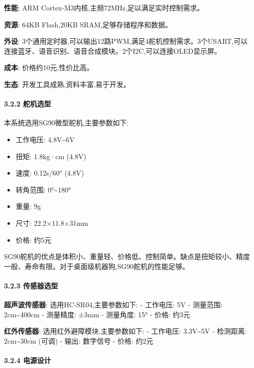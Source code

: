\documentclass[
]{article}
\providecommand{\tightlist}{%
  \setlength{\itemsep}{0pt}\setlength{\parskip}{0pt}}
\begin{document}
\textbf{性能}: ARM Cortex-M3内核,主频72MHz,足以满足实时控制需求。

\textbf{资源}: 64KB Flash,20KB SRAM,足够存储程序和数据。

\textbf{外设}:
3个通用定时器,可以输出12路PWM,满足4舵机控制需求。3个USART,可以连接蓝牙、语音识别、语音合成模块。2个I2C,可以连接OLED显示屏。

\textbf{成本}: 价格约10元,性价比高。

\textbf{生态}: 开发工具成熟,资料丰富,易于开发。

\hypertarget{ux8235ux673aux9009ux578b}{%
\paragraph{3.2.2 舵机选型}\label{ux8235ux673aux9009ux578b}}

本系统选用SG90微型舵机,主要参数如下:

\begin{itemize}
\tightlist
\item
  工作电压: 4.8V\textasciitilde6V
\item
  扭矩: 1.8kg·cm (4.8V)
\item
  速度: 0.12s/60° (4.8V)
\item
  转角范围: 0°\textasciitilde180°
\item
  重量: 9g
\item
  尺寸: 22.2×11.8×31mm
\item
  价格: 约5元
\end{itemize}

SG90舵机的优点是体积小、重量轻、价格低、控制简单。缺点是扭矩较小、精度一般、寿命有限。对于桌面级机器狗,SG90舵机的性能足够。

\hypertarget{ux4f20ux611fux5668ux9009ux578b}{%
\paragraph{3.2.3 传感器选型}\label{ux4f20ux611fux5668ux9009ux578b}}

\textbf{超声波传感器}: 选用HC-SR04,主要参数如下: - 工作电压: 5V -
测量范围: 2cm\textasciitilde400cm - 测量精度: ±3mm - 测量角度: 15° -
价格: 约3元

\textbf{红外传感器}: 选用红外避障模块,主要参数如下: - 工作电压:
3.3V\textasciitilde5V - 检测距离: 2cm\textasciitilde30cm (可调) - 输出:
数字信号 - 价格: 约2元

\hypertarget{ux7535ux6e90ux8bbeux8ba1}{%
\paragraph{3.2.4 电源设计}\label{ux7535ux6e90ux8bbeux8ba1}}
\end{document}
